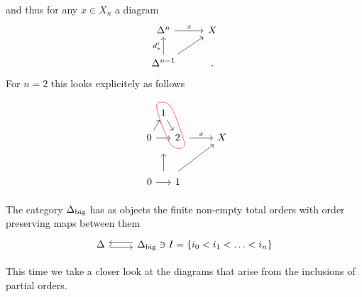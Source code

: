 and thus for any $ x \in X_n $ a diagram
\[
\begin{tikzcd}
    \Delta^n
    \ar[r , " x " ]
    &
    X
    \\
    \Delta^{n-1}
    \ar[ru]
    \ar[u,"d_*^i"]
    &
    .
\end{tikzcd}
\]
For $ n = 2 $ this looks explicitely as follows
\[
\begin{tikzcd}
    \begin{tikzpicture}
        \node (A) at (0,0.866) {$1$};
        \node (B) at (-0.5,0) {$0$};
        \node (C) at (0.5,0) {$2$};
        \draw [->] (A) -- (C);
        \draw [->] (B) -- (A);
        \draw [->] (B) -- (C);
        \draw [red] plot [smooth cycle] coordinates {(A.north west) (A.north east) (C.south east) (C.south west) };
    \end{tikzpicture}
    \ar[r , "x"]
    &
    X
    \\
    \tikz{
        \node (0) at (-0.5,0) {$0$};
        \node (1) at (0.5,0) {$1$};
        \draw [->] (0) to (1);
    \ar[ru]
    \ar[u]
    }
\end{tikzcd}     
\]
    
\begin{defi}
    The category $\Delta_{\operatorname{big}}$ has as objects the finite non-empty total orders with order preserving maps between them
    \[
    \begin{tabular}{c}
         \begin{tikzcd}
             \Delta
             \arrow[r, hook, shift right]
             &
             \Delta_{\txtbig} 
             \arrow[l, shift right] \ni I = \{ i_0 < i_1 < \dotsc < i_n \}
         \end{tikzcd}      
    \end{tabular}
    \]
\end{defi}

This time we take a closer look at the diagrams that arise from the inclusions of partial orders.

